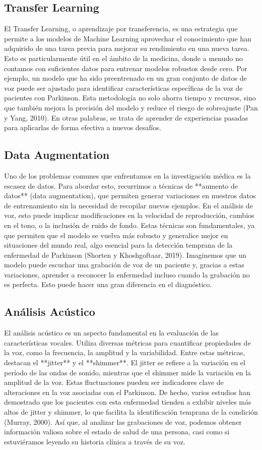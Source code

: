 \documentclass[listof=nochaptergap,12pt,times,authoryear]{report}
\begin{document}
\subsection{Transfer Learning}
El Transfer Learning, o aprendizaje por transferencia, es una estrategia que permite a los modelos de Machine Learning aprovechar el conocimiento que han adquirido de una tarea previa para mejorar su rendimiento en una nueva tarea. Esto es particularmente útil en el ámbito de la medicina, donde a menudo no contamos con suficientes datos para entrenar modelos robustos desde cero. Por ejemplo, un modelo que ha sido preentrenado en un gran conjunto de datos de voz puede ser ajustado para identificar características específicas de la voz de pacientes con Parkinson. Esta metodología no solo ahorra tiempo y recursos, sino que también mejora la precisión del modelo y reduce el riesgo de sobreajuste (Pan y Yang, 2010). En otras palabras, se trata de aprender de experiencias pasadas para aplicarlas de forma efectiva a nuevos desafíos.

\subsection{Data Augmentation}
Uno de los problemas comunes que enfrentamos en la investigación médica es la escasez de datos. Para abordar esto, recurrimos a técnicas de **aumento de datos** (data augmentation), que permiten generar variaciones en nuestros datos de entrenamiento sin la necesidad de recopilar nuevos ejemplos. En el análisis de voz, esto puede implicar modificaciones en la velocidad de reproducción, cambios en el tono, o la inclusión de ruido de fondo. Estas técnicas son fundamentales, ya que permiten que el modelo se vuelva más robusto y generalice mejor en situaciones del mundo real, algo esencial para la detección temprana de la enfermedad de Parkinson (Shorten y Khoshgoftaar, 2019). Imaginemos que un modelo puede escuchar una grabación de voz de un paciente y, gracias a estas variaciones, aprender a reconocer la enfermedad incluso cuando la grabación no es perfecta. Esto puede hacer una gran diferencia en el diagnóstico.

\subsection{Análisis Acústico}
El análisis acústico es un aspecto fundamental en la evaluación de las características vocales. Utiliza diversas métricas para cuantificar propiedades de la voz, como la frecuencia, la amplitud y la variabilidad. Entre estas métricas, destacan el **jitter** y el **shimmer**. El jitter se refiere a la variación en el período de las ondas de sonido, mientras que el shimmer mide la variación en la amplitud de la voz. Estas fluctuaciones pueden ser indicadores clave de alteraciones en la voz asociadas con el Parkinson. De hecho, varios estudios han demostrado que los pacientes con esta enfermedad tienden a exhibir niveles más altos de jitter y shimmer, lo que facilita la identificación temprana de la condición (Murray, 2000). Así que, al analizar las grabaciones de voz, podemos obtener información valiosa sobre el estado de salud de una persona, casi como si estuviéramos leyendo su historia clínica a través de su voz.
\end{document}
